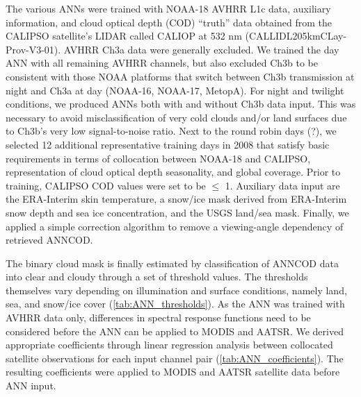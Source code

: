 The various ANNs were trained with NOAA-18 AVHRR L1c data, auxiliary information, and cloud optical depth (COD) ``truth'' data obtained from the CALIPSO satellite's LIDAR called CALIOP at 532 nm (\mbox{CAL\textunderscore LID\textunderscore L2\textunderscore 05kmCLay-Prov-V3-01}). AVHRR Ch3a data were generally excluded. We trained the day ANN with all remaining AVHRR channels, but also excluded Ch3b to be consistent with those NOAA platforms that switch between Ch3b transmission at night and Ch3a at day (NOAA-16, NOAA-17, MetopA). For night and twilight conditions, we produced ANNs both with and without Ch3b data input. This was necessary to avoid misclassification of very cold clouds and/or land surfaces due to Ch3b's very low signal-to-noise ratio. Next to the round robin days (?), we selected 12 additional representative training days in 2008 that satisfy basic requirements in terms of collocation between NOAA-18 and CALIPSO, representation of cloud optical depth seasonality, and global coverage. Prior to training, CALIPSO COD values were set to be $\le$ 1. Auxiliary data input are the ERA-Interim skin temperature, a snow/ice mask derived from ERA-Interim snow depth and sea ice concentration, and the USGS land/sea mask. Finally, we applied a simple correction algorithm to remove a viewing-angle dependency of retrieved ANNCOD.

The binary cloud mask is finally estimated by classification of ANNCOD data into clear and cloudy through a set of threshold values. The thresholds themselves vary depending on illumination and surface conditions, namely land, sea, and snow/ice cover (\autoref{tab:ANN_thresholds}). As the ANN was trained with AVHRR data only, differences in spectral response functions need to be considered before the ANN can be applied to MODIS and AATSR. We derived appropriate coefficients through linear regression analysis between collocated satellite observations for each input channel pair (\autoref{tab:ANN_coefficients}). The resulting coefficients were applied to MODIS and AATSR satellite data before ANN input.

